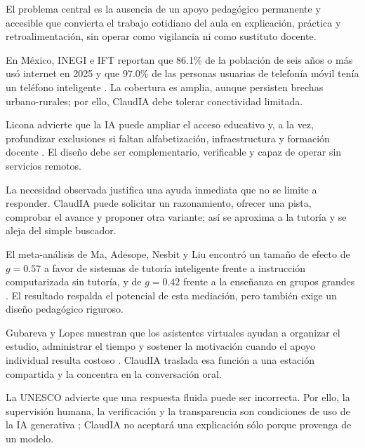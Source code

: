\documentclass[11pt]{article}
\newcommand{\Section}[1]{\par\vspace{0.16\baselineskip}{\normalfont\normalsize\bfseries\RaggedRight #1\par}}
\begin{document}
El problema central es la ausencia de un apoyo pedagógico permanente y accesible que convierta el trabajo cotidiano del aula en explicación, práctica y retroalimentación, sin operar como vigilancia ni como sustituto docente.

En México, INEGI e IFT reportan que 86.1\% de la población de seis años o más usó internet en 2025 y que 97.0\% de las personas usuarias de telefonía móvil tenía un teléfono inteligente \cite{inegi2026}. La cobertura es amplia, aunque persisten brechas urbano-rurales; por ello, ClaudIA debe tolerar conectividad limitada.

Licona advierte que la IA puede ampliar el acceso educativo y, a la vez, profundizar exclusiones si faltan alfabetización, infraestructura y formación docente \cite{licona2024}. El diseño debe ser complementario, verificable y capaz de operar sin servicios remotos.

\clearpage

\Section{Justificación}

La necesidad observada justifica una ayuda inmediata que no se limite a responder. ClaudIA puede solicitar un razonamiento, ofrecer una pista, comprobar el avance y proponer otra variante; así se aproxima a la tutoría y se aleja del simple buscador.

El meta-análisis de Ma, Adesope, Nesbit y Liu encontró un tamaño de efecto de $g=0.57$ a favor de sistemas de tutoría inteligente frente a instrucción computarizada sin tutoría, y de $g=0.42$ frente a la enseñanza en grupos grandes \cite{ma2014}. El resultado respalda el potencial de esta mediación, pero también exige un diseño pedagógico riguroso.

Gubareva y Lopes muestran que los asistentes virtuales ayudan a organizar el estudio, administrar el tiempo y sostener la motivación cuando el apoyo individual resulta costoso \cite{gubareva2020}. ClaudIA traslada esa función a una estación compartida y la concentra en la conversación oral.

La UNESCO advierte que una respuesta fluida puede ser incorrecta. Por ello, la supervisión humana, la verificación y la transparencia son condiciones de uso de la IA generativa \cite{unesco2024guide}; ClaudIA no aceptará una explicación sólo porque provenga de un modelo.

\clearpage
\end{document}
